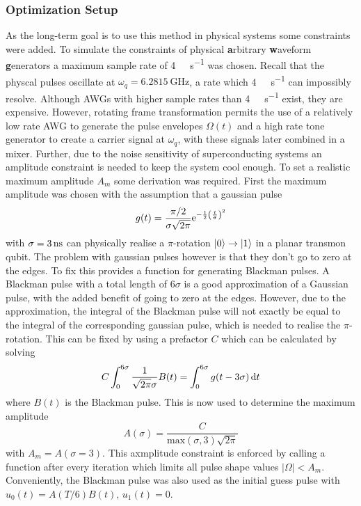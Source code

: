 \documentclass[main.tex]{subfiles}
\begin{document}
\subsubsection{Optimization Setup}
As the long-term goal is to use this method in physical systems some constraints were added.
To simulate the constraints of physical \textbf{a}rbitrary \textbf{w}aveform \textbf{g}enerators a maximum sample rate of \SI{4}{\giga\samples\per\second} was chosen.
Recall that the physcal pulses oscillate at \( \omega_{q} = \SI{6.2815}{\giga\hertz} \), a rate which \SI{4}{\giga\samples\per\second} can impossibly resolve.
Although AWGs with higher sample rates than \SI{4}{\giga\samples\per\second} exist, they are expensive.
However, rotating frame transformation permits the use of a relatively low rate AWG to generate the pulse envelopes \( \Omega(t) \) and a high rate tone generator to create a carrier signal at \( \omega_{q} \), with these signals later combined in a mixer.
Further, due to the noise sensitivity of superconducting systems an amplitude constraint is needed to keep the system cool enough.
To set a realistic maximum amplitude \( A_m \) some derivation was required.
First the maximum amplitude was chosen with the assumption that a gaussian pulse
\begin{equation}
    g(t) = \frac{\pi/2}{\sigma\sqrt{2\pi}} \mathrm{e}^{-\frac{1}{2}\qty(\frac{t}{\sigma})^2}
\end{equation}
with \( \sigma = \SI{3}{\nano\second} \) can physically realise a \(\pi\)-rotation \( \ket{0} \rightarrow \ket{1} \) in a planar transmon qubit.
The problem with gaussian pulses however is that they don't go to zero at the edges.
To fix this \krotov{} provides a function for generating Blackman pulses.
A Blackman pulse with a total length of \(6\sigma\) is a good approximation of a Gaussian pulse, with the added benefit of going to zero at the edges.
However, due to the approximation, the integral of the Blackman pulse will not exactly be equal to the integral of the corresponding gaussian pulse, which is needed to realise the \(\pi\)-rotation.
This can be fixed by using a prefactor \(C\) which can be calculated by solving
\begin{equation}
    C \int_0^{6\sigma}\frac{1}{\sqrt{2\pi}\sigma} B(t) = \int_0^{6\sigma}g(t-3\sigma)\,\mathrm{d} t
\end{equation}
where \(B(t)\) is the Blackman pulse.
This is now used to determine the maximum amplitude
\begin{equation}
    A(\sigma) = \frac{C}{\text{max}(\sigma,3)\sqrt{2\pi}}
\end{equation}
with \(A_m = A(\sigma = 3)\). 
This axmplitude constraint is enforced by calling a function after every iteration which limits all pulse shape values \(|\Omega| < A_m\).
Conveniently, the Blackman pulse was also used as the initial guess pulse with \(u_0(t) = A(T/6)B(t),\, u_1(t)=0\).
\end{document}
